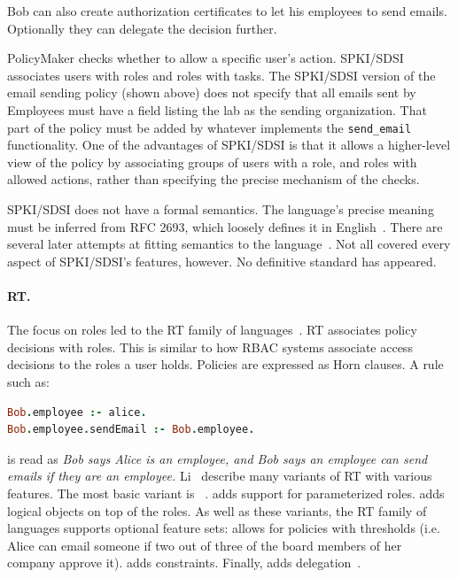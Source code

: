 \documentclass[thesis.tex]{subfiles}
\begin{document}
\noindent{}

Bob can also create authorization certificates to let his employees
to send emails. Optionally they can delegate the decision further.

\noindent{}

PolicyMaker checks whether to allow a specific user's action. SPKI/SDSI associates users with roles and
roles with tasks. The SPKI/SDSI version of the email sending policy (shown above) does not
specify that all emails sent by Employees must have a field listing the lab as
the sending organization. That part of the policy must be added by
whatever implements the \texttt{send\_email} functionality. One of the
advantages of SPKI/SDSI is that it allows a higher-level view of the policy by
associating groups of users with a role, and roles with allowed actions, rather than specifying the precise mechanism of the checks.

SPKI/SDSI does not have a formal semantics.  The language's precise
meaning must be inferred from RFC 2693, which loosely defines it in
English~\cite{ellison_spki_1999}. There are several later attempts at
fitting semantics to the
language~\cite{joseph_y._halpern_logic_1999,abadi_sdsis_1998,howell_formal_2000,dwaine_clarke_certificate_2001}.
Not all covered every aspect of SPKI/SDSI's features, however. No
definitive standard has appeared.

\paragraph*{RT.}
The focus on roles led to the RT family of
languages~\cite{ninghui_li_design_2002}. RT associates policy
decisions with roles. This is similar to how \ac{RBAC} systems associate access
decisions to the roles a user holds.  Policies are expressed as Horn
clauses.  A rule such as:

\begin{lstlisting}[language=prolog]
Bob.employee :- alice.
Bob.employee.sendEmail :- Bob.employee.
\end{lstlisting}

\noindent is read as \emph{Bob says Alice is an employee, and Bob says
an employee can send emails if they are an employee.}  Li~\etal{}
describe many variants of RT with various features.  The most basic
variant is ~\cite{li_distributed_2003}.  adds support
for parameterized roles.  adds logical objects on top of the
roles.  As well as these variants, the RT family of languages supports
optional feature sets:  allows for policies with thresholds
(i.e. Alice can email someone if two out of three of the board members
of her company approve it).  adds constraints. Finally,
 adds delegation~\cite{ninghui_li_design_2002}.
\end{document}
